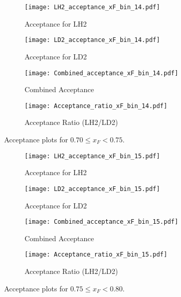 \documentclass{article}
\begin{document}
\begin{figure}[H]
    \centering
    \begin{subfigure}[b]{0.48\textwidth}
       \texttt{[image: LH2\_acceptance\_xF\_bin\_14.pdf]}
       \caption{Acceptance for LH2}
    \end{subfigure}
    \hfill
    \begin{subfigure}[b]{0.48\textwidth}
       \texttt{[image: LD2\_acceptance\_xF\_bin\_14.pdf]}
       \caption{Acceptance for LD2}
    \end{subfigure}

    \begin{subfigure}[b]{0.48\textwidth}
       \texttt{[image: Combined\_acceptance\_xF\_bin\_14.pdf]}
       \caption{Combined Acceptance}
    \end{subfigure}
    \hfill
    \begin{subfigure}[b]{0.48\textwidth}
       \texttt{[image: Acceptance\_ratio\_xF\_bin\_14.pdf]}
       \caption{Acceptance Ratio (LH2/LD2)}
    \end{subfigure}
    \caption{Acceptance plots for $0.70 \le x_F < 0.75$.}
\end{figure}

\begin{figure}[H]
    \centering
    \begin{subfigure}[b]{0.48\textwidth}
       \texttt{[image: LH2\_acceptance\_xF\_bin\_15.pdf]}
       \caption{Acceptance for LH2}
    \end{subfigure}
    \hfill
    \begin{subfigure}[b]{0.48\textwidth}
       \texttt{[image: LD2\_acceptance\_xF\_bin\_15.pdf]}
       \caption{Acceptance for LD2}
    \end{subfigure}

    \begin{subfigure}[b]{0.48\textwidth}
       \texttt{[image: Combined\_acceptance\_xF\_bin\_15.pdf]}
       \caption{Combined Acceptance}
    \end{subfigure}
    \hfill
    \begin{subfigure}[b]{0.48\textwidth}
       \texttt{[image: Acceptance\_ratio\_xF\_bin\_15.pdf]}
       \caption{Acceptance Ratio (LH2/LD2)}
    \end{subfigure}
    \caption{Acceptance plots for $0.75 \le x_F < 0.80$.}
\end{figure}
\end{document}
